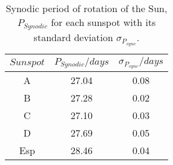\begin{table}[H]
	\centering
	\begin{tabular}{ c c c}
		\hline
		\centering
			$Sunspot$ & $P_{Synodic}/days$ & $\sigma_{P_{sync}}/days$ \\\hline
			A & 27.04 & 0.08 \\
			B & 27.28 & 0.02 \\
			C & 27.10 & 0.03 \\
			D & 27.69 & 0.05 \\
			Esp & 28.46 & 0.04 \\\hline
	\end{tabular}
	\caption{\label{Tab:Synodic}Synodic period of rotation of the Sun, $P_{Synodic}$ for each sunspot with its standard deviation $\sigma_{P_{sync}}$.}
\end{table}
